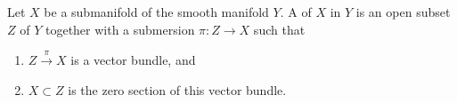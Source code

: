 Let $X$ be a submanifold of the smooth manifold $Y$. A  of $X$ in $Y$ is an open subset $Z$ of $Y$ together with a submersion $\pi: Z \to X$ such that

\begin{enumerate}
\item[(a)] $Z \xrightarrow{\pi} X$ is a vector bundle, and
\item[(b)] $X \subset Z$ is the zero section of this vector bundle.
\end{enumerate}
